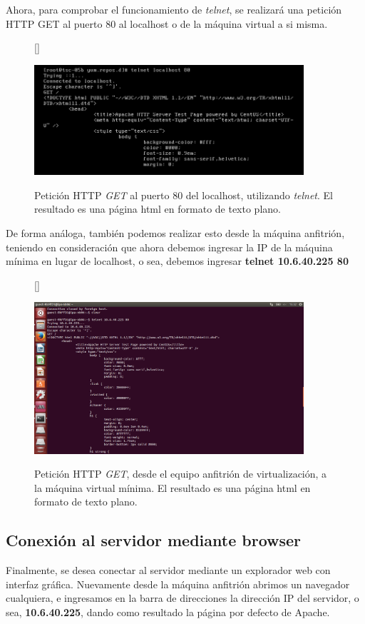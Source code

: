 \documentclass[11pt]{article}
\begin{document}
Ahora, para comprobar el funcionamiento de \textit{telnet}, se realizará una petición HTTP GET al puerto 80 al localhost o de la máquina virtual a si misma.

\begin{figure}[ht]
[\FBwidth]
{\caption{Petición HTTP \textit{GET} al puerto 80 del localhost, utilizando \textit{telnet}. El resultado es una página html en formato de texto plano.}\label{fig:telnetLocalhost80}}
{\includegraphics[width=10cm]{screenshots/communication/telnet-get-80.png}}
\end{figure}

De forma análoga, también podemos realizar esto desde la máquina anfitrión, teniendo en consideración que ahora debemos ingresar la IP de la máquina mínima en lugar de localhost, o sea, debemos ingresar \textbf{telnet 10.6.40.225 80}

\clearpage

\begin{figure}[ht]
[\FBwidth]
{\caption{Petición HTTP \textit{GET}, desde el equipo anfitrión de virtualización, a la máquina virtual mínima. El resultado es una página html en formato de texto plano.}\label{fig:telnetHostToMin}}
{\includegraphics[width=10cm]{screenshots/communication/get-to-min-from-host.png}}
\end{figure}

\subsection{Conexión al servidor mediante browser}
Finalmente, se desea conectar al servidor mediante un explorador web con interfaz gráfica. Nuevamente desde la máquina anfitrión abrimos un navegador cualquiera, e ingresamos en la barra de direcciones la dirección IP del servidor, o sea, \textbf{10.6.40.225}, dando como resultado la página por defecto de Apache.
\end{document}
